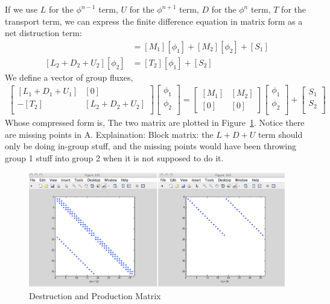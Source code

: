 \documentclass{school-22.211-notes}
\begin{document}
If we use $L$ for the $\phi^{n-1}$ term, $U$ for the $\phi^{n+1}$ term, $D$ for the $\phi^n$ term, $T$ for the transport term, we can express the finite difference equation in matrix form as a net distruction term: 
\begin{align}
[L_1 + D_1 + U_1] [\phi_1] &= [M_1] [\phi_1] + [M_2][\phi_2] + [S_1] \\
[L_2 + D_2 + U_2] [\phi_2] &= [T_2] [\phi_1] + [S_2] 
\end{align}
We define a vector of group fluxes, 
\begin{align}
\left[ \begin{array}{cc} 
[L_1 + D_1 + U_1] & [0] \\
-[T_2] & [L_2 + D_2 + U_2] \\
\end{array} \right] 
\left[ \begin{array}{c}
\phi_1 \\ \phi_2 \\ \end{array} \right] 
= \left[ {\begin{array}{cc} \left[M_1\right] & \left[M_2\right] \\ \left[0\right] & \left[0\right] \end{array}} \right] 
\left[ \begin{array}{c}
\phi_1 \\ \phi_2 \\ \end{array} \right] 
+ 
\left[ \begin{array}{c} 
S_1 \\ S_2 \\ \end{array} \right] 
\end{align}
Whose compressed form is, 
\eqn{ [A] [\phi] = [M] [\phi] + [S] }
The two matrix are plotted in Figure~\ref{matrix-form}. Notice there are missing points in A. Explaination: Block matrix: the $L+D+U$ term should only be doing in-group stuff, and the missing points would have been throwing group 1 stuff into group 2 when it is not supposed to do it. 
\begin{figure}[ht]
  \centering
  \includegraphics[width=6in]{images/dfs/matrix-form.png}
  \caption{Destruction and Production Matrix} \label{matrix-form}
\end{figure}
\end{document}
